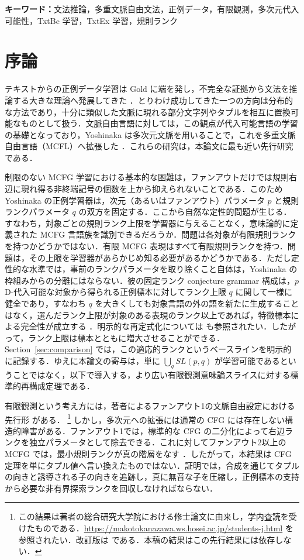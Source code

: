 \documentclass[11pt,a4paper]{ltjsarticle}
\numberwithin{equation}{section}
\theoremstyle{plain}
\theoremstyle{definition}
\theoremstyle{remark}
\providecommand{\keywords}[1]{\par\smallskip\noindent\textbf{キーワード：}#1\par}
\begin{document}
\keywords{文法推論，多重文脈自由文法，正例データ，有限観測，多次元代入可能性，TxtBc 学習，TxtEx 学習，規則ランク}

\section{序論}
\label{sec:introduction}

テキストからの正例データ学習は Gold に端を発し，不完全な証拠から文法を推論する大きな理論へ発展してきた
\cite{Gold1967,Angluin1980,Angluin1982Reversible}．とりわけ成功してきた一つの方向は分布的な方法であり，十分に類似した文脈に現れる部分文字列やタプルを相互に置換可能なものとして扱う．文脈自由言語に対しては，この観点が代入可能言語の学習の基礎となっており，Yoshinaka は多次元文脈を用いることで，これを多重文脈自由言語（MCFL）へ拡張した
\cite{ClarkEyraud2007,Yoshinaka2008,Yoshinaka2009,Yoshinaka2011}．これらの研究は，本論文に最も近い先行研究である．

制限のない MCFG 学習における基本的な困難は，ファンアウトだけでは規則右辺に現れ得る非終端記号の個数を上から抑えられないことである．このため Yoshinaka の正例学習器は，次元（あるいはファンアウト）パラメータ $p$ と規則ランクパラメータ $q$ の双方を固定する．ここから自然な定性的問題が生じる．すなわち，対象ごとの規則ランク上限を学習器に与えることなく，意味論的に定義された MCFG 言語族を識別できるだろうか．問題は各対象が有限規則ランクを持つかどうかではない．有限 MCFG 表現はすべて有限規則ランクを持つ．問題は，その上限を学習器があらかじめ知る必要があるかどうかである．ただし定性的な水準では，事前のランクパラメータを取り除くこと自体は，Yoshinaka の枠組みからの分離にはならない．彼の固定ランク conjecture grammar 構成は，$p$D-代入可能な対象から得られる正例標本に対してランク上限 $q$ に関して一様に健全であり，すなわち $q$ を大きくしても対象言語の外の語を新たに生成することはなく，選んだランク上限が対象のある表現のランク以上であれば，特徴標本による完全性が成立する
\cite{Yoshinaka2011}．明示的な再定式化については
\cite[Proposition~1]{CaseYoshinakaZeugmann2013} も参照されたい．したがって，ランク上限は標本とともに増大させることができる．Section~\ref{sec:comparison} では，この適応的ランクというベースラインを明示的に記録する．ゆえに本論文の寄与は，単に $\bigcup_q SL(p,q)$ が学習可能であるということではなく，以下で導入する，より広い有限観測意味論スライスに対する標準的再構成定理である．

有限観測という考え方には，著者によるファンアウト1の文脈自由設定における先行形
\cite{kuriyamaCFG} がある．%
\footnote{この結果は著者の総合研究大学院における修士論文に由来し，学内査読を受けたものである．\url{https://makotokanazawa.ws.hosei.ac.jp/students-j.html} を参照されたい．改訂版は \cite{kuriyamaCFG} である．本稿の結果はこの先行結果には依存しない．}
しかし，多次元への拡張には通常の CFG には存在しない構造的障害がある．ファンアウト1では，標準的な CFG の二分化によって右辺ランクを独立パラメータとして除去できる．これに対してファンアウト2以上の MCFG では，最小規則ランクが真の階層をなす
\cite{RambowSatta1999}．したがって，本結果は CFG 定理を単にタプル値へ言い換えたものではない．証明では，合成を通じてタプルの向きと誘導される子の向きを追跡し，真に無音な子を圧縮し，正例標本の支持から必要な非有界探索ランクを回収しなければならない．
\end{document}
